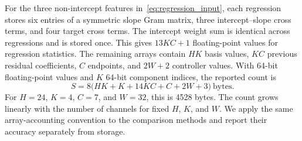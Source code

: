 For the three non-intercept features in~\eqref{eq:regression_input}, each regression stores six entries of a symmetric slope Gram matrix, three intercept--slope cross terms, and four target cross terms. The intercept weight sum is identical across regressions and is stored once. This gives $13KC+1$ floating-point values for regression statistics. The remaining arrays contain $HK$ basis values, $KC$ previous residual coefficients, $C$ endpoints, and $2W+2$ controller values. With 64-bit floating-point values and $K$ 64-bit component indices, the reported count is
\begin{equation}
 S=8\bigl(HK+K+14KC+C+2W+3\bigr)\ \text{bytes}.
 \label{eq:state_bytes}
\end{equation}
For $H=24$, $K=4$, $C=7$, and $W=32$, this is 4528 bytes. The count grows linearly with the number of channels for fixed $H$, $K$, and $W$. We apply the same array-accounting convention to the comparison methods and report their accuracy separately from storage.
